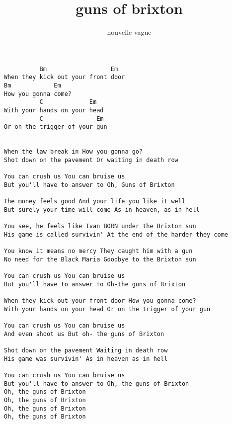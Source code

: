 \author{nouvelle vague}
\title{guns of brixton}
\maketitle
\begin{verbatim}
          Bm                  Em
When they kick out your front door
Bm            Em
How you gonna come?
          C             Em
With your hands on your head
          C               Em
Or on the trigger of your gun


When the law break in How you gonna go?
Shot down on the pavement Or waiting in death row

You can crush us You can bruise us
But you'll have to answer to Oh, Guns of Brixton

The money feels good And your life you like it well
But surely your time will come As in heaven, as in hell

You see, he feels like Ivan BORN under the Brixton sun
His game is called survivin' At the end of the harder they come

You know it means no mercy They caught him with a gun
No need for the Black Maria Goodbye to the Brixton sun

You can crush us You can bruise us
But you'll have to answer to Oh-the guns of Brixton

When they kick out your front door How you gonna come?
With your hands on your head Or on the trigger of your gun

You can crush us You can bruise us
And even shoot us But oh- the guns of Brixton

Shot down on the pavement Waiting in death row
His game was survivin' As in heaven as in hell

You can crush us You can bruise us
But you'll have to answer to Oh, the guns of Brixton
Oh, the guns of Brixton
Oh, the guns of Brixton
Oh, the guns of Brixton
Oh, the guns of Brixton
\end{verbatim}